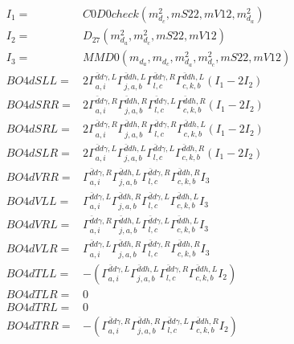 \documentclass[A4,landscape]{article}
\begin{document}
\begin{align} 
I_1 = & C0D0check(m^2_{d_{{c}}}, mS22, mV12, m^2_{d_{{a}}}) \\ 
I_2 = & D_{27}(m^2_{d_{{a}}}, m^2_{d_{{c}}}, mS22, mV12) \\ 
I_3 = & MMD0(m_{d_{{a}}}, m_{d_{{c}}}, m^2_{d_{{a}}}, m^2_{d_{{c}}}, mS22, mV12) \\ 
  BO4dSLL= & 2  \Gamma^{\bar{d}d \gamma ,L}_{a, i} \Gamma^{\bar{d}d h ,L}_{j, a, b} \Gamma^{\bar{d}d \gamma ,R}_{l, c} \Gamma^{\bar{d}d h ,L}_{c, k, b} (I_1 - 2 I_2) \\ 
  BO4dSRR= & 2  \Gamma^{\bar{d}d \gamma ,R}_{a, i} \Gamma^{\bar{d}d h ,R}_{j, a, b} \Gamma^{\bar{d}d \gamma ,L}_{l, c} \Gamma^{\bar{d}d h ,R}_{c, k, b} (I_1 - 2 I_2) \\ 
  BO4dSRL= & 2  \Gamma^{\bar{d}d \gamma ,R}_{a, i} \Gamma^{\bar{d}d h ,R}_{j, a, b} \Gamma^{\bar{d}d \gamma ,R}_{l, c} \Gamma^{\bar{d}d h ,L}_{c, k, b} (I_1 - 2 I_2) \\ 
  BO4dSLR= & 2  \Gamma^{\bar{d}d \gamma ,L}_{a, i} \Gamma^{\bar{d}d h ,L}_{j, a, b} \Gamma^{\bar{d}d \gamma ,L}_{l, c} \Gamma^{\bar{d}d h ,R}_{c, k, b} (I_1 - 2 I_2) \\ 
  BO4dVRR= &  \Gamma^{\bar{d}d \gamma ,R}_{a, i} \Gamma^{\bar{d}d h ,L}_{j, a, b} \Gamma^{\bar{d}d \gamma ,R}_{l, c} \Gamma^{\bar{d}d h ,R}_{c, k, b} I_3 \\ 
  BO4dVLL= &  \Gamma^{\bar{d}d \gamma ,L}_{a, i} \Gamma^{\bar{d}d h ,R}_{j, a, b} \Gamma^{\bar{d}d \gamma ,L}_{l, c} \Gamma^{\bar{d}d h ,L}_{c, k, b} I_3 \\ 
  BO4dVRL= &  \Gamma^{\bar{d}d \gamma ,R}_{a, i} \Gamma^{\bar{d}d h ,L}_{j, a, b} \Gamma^{\bar{d}d \gamma ,L}_{l, c} \Gamma^{\bar{d}d h ,L}_{c, k, b} I_3 \\ 
  BO4dVLR= &  \Gamma^{\bar{d}d \gamma ,L}_{a, i} \Gamma^{\bar{d}d h ,R}_{j, a, b} \Gamma^{\bar{d}d \gamma ,R}_{l, c} \Gamma^{\bar{d}d h ,R}_{c, k, b} I_3 \\ 
  BO4dTLL= & -( \Gamma^{\bar{d}d \gamma ,L}_{a, i} \Gamma^{\bar{d}d h ,L}_{j, a, b} \Gamma^{\bar{d}d \gamma ,R}_{l, c} \Gamma^{\bar{d}d h ,L}_{c, k, b} I_2) \\ 
  BO4dTLR= & 0 \\ 
  BO4dTRL= & 0 \\ 
  BO4dTRR= & -( \Gamma^{\bar{d}d \gamma ,R}_{a, i} \Gamma^{\bar{d}d h ,R}_{j, a, b} \Gamma^{\bar{d}d \gamma ,L}_{l, c} \Gamma^{\bar{d}d h ,R}_{c, k, b} I_2) \\ 
\end{align} 
\end{document}
